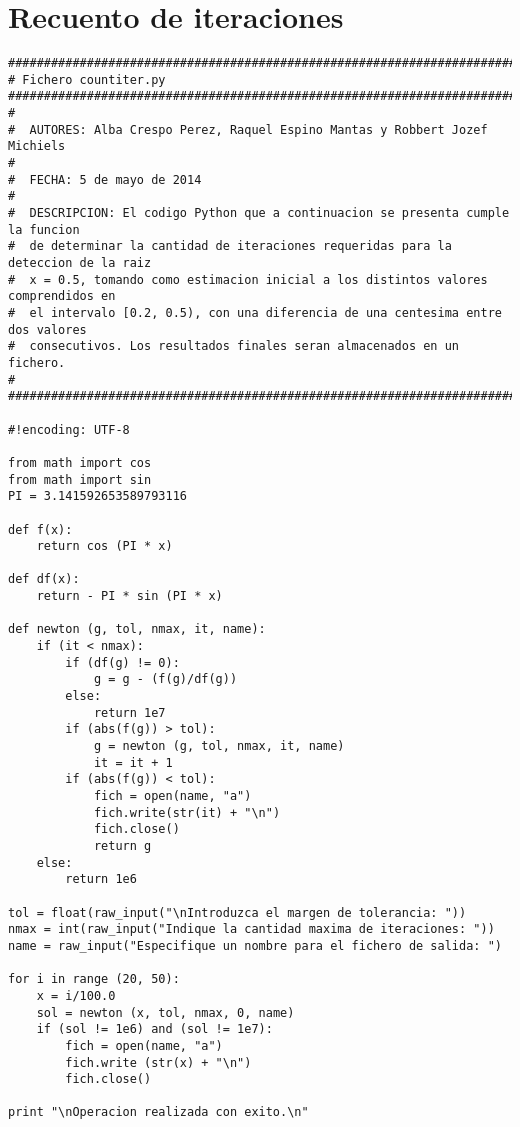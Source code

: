 \section{Recuento de iteraciones}
\label{Apendice2:label}

\begin{center}
\begin{footnotesize}

\begin{verbatim}
#######################################################################################
# Fichero countiter.py
#######################################################################################
#
#  AUTORES: Alba Crespo Perez, Raquel Espino Mantas y Robbert Jozef Michiels
#   
#  FECHA: 5 de mayo de 2014
#
#  DESCRIPCION: El codigo Python que a continuacion se presenta cumple la funcion
#  de determinar la cantidad de iteraciones requeridas para la deteccion de la raiz
#  x = 0.5, tomando como estimacion inicial a los distintos valores comprendidos en
#  el intervalo [0.2, 0.5), con una diferencia de una centesima entre dos valores 
#  consecutivos. Los resultados finales seran almacenados en un fichero.
#
#######################################################################################

#!encoding: UTF-8

from math import cos
from math import sin
PI = 3.141592653589793116

def f(x):
    return cos (PI * x)

def df(x):
    return - PI * sin (PI * x)

def newton (g, tol, nmax, it, name):
    if (it < nmax):
        if (df(g) != 0):
            g = g - (f(g)/df(g))
        else:
            return 1e7
        if (abs(f(g)) > tol):
            g = newton (g, tol, nmax, it, name)
            it = it + 1
        if (abs(f(g)) < tol):
            fich = open(name, "a")
            fich.write(str(it) + "\n")
            fich.close()
            return g
    else:
        return 1e6

tol = float(raw_input("\nIntroduzca el margen de tolerancia: "))
nmax = int(raw_input("Indique la cantidad maxima de iteraciones: "))
name = raw_input("Especifique un nombre para el fichero de salida: ")

for i in range (20, 50):
    x = i/100.0
    sol = newton (x, tol, nmax, 0, name)
    if (sol != 1e6) and (sol != 1e7):
        fich = open(name, "a")
        fich.write (str(x) + "\n")
        fich.close()

print "\nOperacion realizada con exito.\n"

\end{verbatim}

\end{footnotesize}
\end{center}

